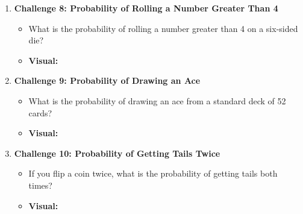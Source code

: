 \begin{enumerate}
    \item \textbf{Challenge 8: Probability of Rolling a Number Greater Than 4}
    \begin{itemize}
        \item What is the probability of rolling a number greater than 4 on a six-sided die?
        \item \textbf{Visual:}
        \begin{center}
        \end{center}
    \end{itemize}

    \item \textbf{Challenge 9: Probability of Drawing an Ace}
    \begin{itemize}
        \item What is the probability of drawing an ace from a standard deck of 52 cards?
        \item \textbf{Visual:}
        \begin{center}
        \end{center}
    \end{itemize}

    \item \textbf{Challenge 10: Probability of Getting Tails Twice}
    \begin{itemize}
        \item If you flip a coin twice, what is the probability of getting tails both times?
        \item \textbf{Visual:}
        \begin{center}
        \end{center}
    \end{itemize}
    
\end{enumerate}
